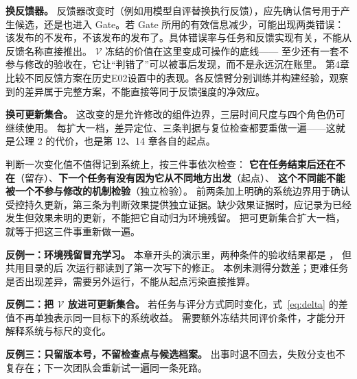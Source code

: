 \textbf{换反馈器。}
反馈器改变时（例如用模型自评替换执行反馈），应先确认信号用于产生候选，还是也进入 Gate。若 Gate 所用的有效信息减少，可能出现两类错误：该发布的不发布，不该发布的发布了。具体错误率与任务和反馈实现有关，不能从反馈名称直接推出。
$\mathcal V$ 冻结的价值在这里变成可操作的底线——
至少还有一套不参与修改的验收在，它让“判错了”可以被事后发现，而不是永远沉在账里。
第4章比较不同反馈方案在历史E02设置中的表现。各反馈臂分别训练并构建经验，观察到的差异属于完整方案，不能直接等同于反馈强度的净效应。

\textbf{换可更新集合。}
这改变的是允许修改的组件边界，三层时间尺度与四个角色仍可继续使用。
每扩大一档，差异定位、三条判据与复位检查都要重做一遍——这就是公理 2 的代价，也是第 12、14 章各自的起点。

\begin{principlebox}
判断一次变化值不值得记到系统上，按三件事依次检查：
\textbf{它在任务结束后还在不在}（留存）、\textbf{下一个任务有没有因为它从不同地方出发}（起点）、
\textbf{这个不同能不能被一个不参与修改的机制检验}（独立检验）。
前两条加上明确的系统边界用于确认受控持久更新，第三条为判断效果提供独立证据。缺少效果证据时，应记录为已经发生但效果未明的更新，不能把它自动归为环境残留。
把可更新集合扩大一档，就等于把这三件事重新做一遍。
\end{principlebox}

\begin{pitfallbox}
\textbf{反例一：环境残留冒充学习。}
本章开头的演示里，两种条件的验收结果都是 ，
但共用目录的后  次运行都读到了第一次写下的修正。
本例未测得分数差；更难任务是否出现差异，需要另外运行，不能从起点污染直接推算。

\textbf{反例二：把 $\mathcal V$ 放进可更新集合。}
若任务与评分方式同时变化，式~\eqref{eq:delta} 的差值不再单独表示同一目标下的系统收益。
需要额外冻结共同评价条件，才能分开解释系统与标尺的变化。

\textbf{反例三：只留版本号，不留检查点与候选档案。}
出事时退不回去，失败分支也不复存在；下一次团队会重新试一遍同一条死路。
\end{pitfallbox}

